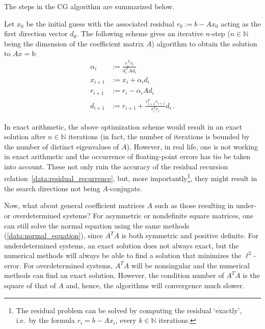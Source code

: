     The steps in the CG algorithm are summarized below.
    \begin{method}
        Let $x_0$ be the initial guess with the associated residual $r_0:=b-Ax_0$ acting as the first direction vector $d_0$. The following scheme gives an iterative $n$-step ($n\in\mathbb{N}$ being the dimension of the coefficient matrix $A$) algorithm to obtain the solution to $Ax=b$:
        \begin{align}
            \alpha_i &:= \frac{r_i^{\,T}r_i}{d_i^{\,T}\!Ad_i}\nonumber\\
            x_{i+1} &:= x_i+\alpha_id_i\nonumber\\
            r_{i+1} &:= r_i-\alpha_iAd_i\label{data:residual_recurrence}\\
            d_{i+1} &:= r_{i+1}+\frac{r_{i+1}^Tr_{i+1}}{r_i^Tr_i}d_i\,.\label{data:beta}
        \end{align}
    \end{method}

    \begin{remark}
        In exact arithmetic, the above optimization scheme would result in an exact solution after $n\in\mathbb{N}$ iterations (in fact, the number of iterations is bounded by the number of distinct eigenvalues of $A$). However, in real life, one is not working in exact arithmetic and the occurrence of floating-point errors has tio be taken into account. These not only ruin the accuracy of the residual recursion relation~\eqref{data:residual_recurrence}, but, more importantly\footnote{The residual problem can be solved by computing the residual `exactly', i.e.~by the formula $r_i=b-Ax_i$, every $k\in\mathbb{N}$ iterations.}, they might result in the search directions not being $A$-conjugate.
    \end{remark}

    Now, what about general coefficient matrices $A$ such as those resulting in under- or overdetermined systems? For asymmetric or nondefinite square matrices, one can still solve the normal equation using the same methods (\cref{data:normal_equation}), since $A^T\!A$ is both symmetric and positive definite. For underdetermined systems, an exact solution does not always exact, but the numerical methods will always be able to find a solution that minimizes the $\ell^2$-error. For overdetermined systems, $A^T\!A$ will be nonsingular and the numerical methods can find an exact solution. However, the condition number of $A^T\!A$ is the square of that of $A$ and, hence, the algorithms will convergence much slower.

